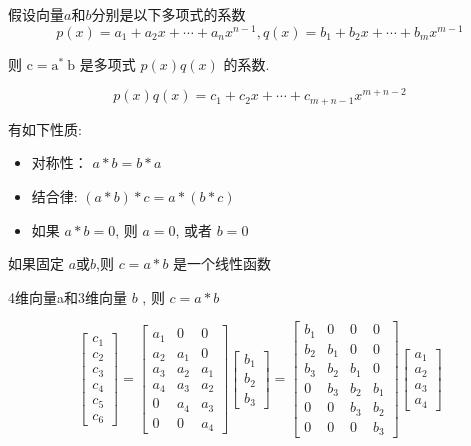 \begin{corollary}
    假设向量$a$和$b$分别是以下多项式的系数
    $$ p(x)=a_{1}+a_{2} x+\cdots+a_{n} x^{n-1}, q(x)=b_{1}+b_{2} x+\cdots+b_{m} x^{m-1} $$

    则 $ \mathrm{c}=\mathrm{a}^{*} \mathrm{~b} $ 是多项式 $ p(x) q(x) $ 的系数.

    $$ p(x) q(x)=c_{1}+c_{2} x+\cdots+c_{m+n-1} x^{m+n-2} $$
\end{corollary}

\begin{corollary}[卷积性质]
    有如下性质:
    \begin{itemize}
        \item 对称性： $ a * b=b * a $
        \item 结合律: $ (a * b) * c=a *(b * c) $
        \item 如果 $ a * b=0 $, 则 $ a=0 $, 或者 $ b=0 $
    \end{itemize}
\end{corollary}

\begin{corollary}
    如果固定 $ a $或$b$,则 $ c=a * b $ 是一个线性函数
\end{corollary}

\begin{example}
    4维向量a和3维向量 $ b $ ,  则 $ c=a * b $

$$
\left[\begin{array}{l}
c_{1} \\
c_{2} \\
c_{3} \\
c_{4} \\
c_{5} \\
c_{6}
\end{array}\right]=\left[\begin{array}{lll}
a_{1} & 0 & 0 \\
a_{2} & a_{1} & 0 \\
a_{3} & a_{2} & a_{1} \\
a_{4} & a_{3} & a_{2} \\
0 & a_{4} & a_{3} \\
0 & 0 & a_{4}
\end{array}\right]\left[\begin{array}{l}
b_{1} \\
b_{2} \\
b_{3}
\end{array}\right]=\left[\begin{array}{cccc}
b_{1} & 0 & 0 & 0 \\
b_{2} & b_{1} & 0 & 0 \\
b_{3} & b_{2} & b_{1} & 0 \\
0 & b_{3} & b_{2} & b_{1} \\
0 & 0 & b_{3} & b_{2} \\
0 & 0 & 0 & b_{3}
\end{array}\right]\left[\begin{array}{l}
a_{1} \\
a_{2} \\
a_{3} \\
a_{4}
\end{array}\right]
$$
\end{example}

